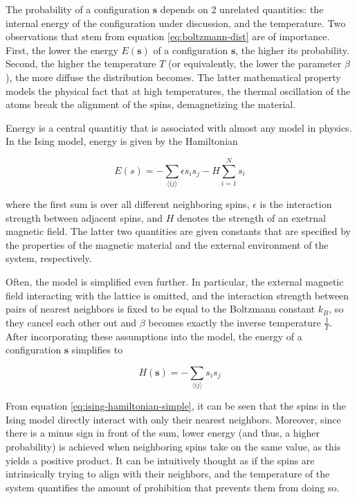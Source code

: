 \documentclass[12pt]{article}
\begin{document}
The probability of a configuration $\boldsymbol{s}$ depends on 2 unrelated quantities: the internal energy of the configuration under discussion, and the temperature. Two observations that stem from equation \ref{eq:boltzmann-dist} are of importance. First, the lower the energy $E(\boldsymbol{s})$ of a configuration $\boldsymbol{s}$, the higher its probability. Second, the higher the temperature $T$ (or equivalently, the lower the parameter $\beta$), the more diffuse the distribution becomes. The latter mathematical property models the physical fact that at high temperatures, the thermal oscillation of the atoms break the alignment of the spins, demagnetizing the material. 

Energy is a central quantitiy that is associated with almost any model in physics. In the Ising model, energy is given by the Hamiltonian

\begin{equation}
E(s) = - \sum_{\langle ij \rangle} \epsilon s_i s_j - H \sum_{i=1}^N s_i
\label{eq:ising-hamiltonian}
\end{equation}

where the first sum is over all different neighboring spins, $\epsilon$ is the interaction strength between adjacent spins, and $H$ denotes the strength of an exetrnal magnetic field. The latter two quantities are given constants that are specified by the properties of the magnetic material and the external environment of the system, respectively.

Often, the model is simplified even further. In particular, the external magnetic field interacting with the lattice is omitted, and the interaction strength between pairs of nearest neighbors is fixed to be equal to the Boltzmann constant $k_B$, so they cancel each other out and $\beta$ becomes exactly the inverse temperature $\frac{1}{T}$. After incorporating these assumptions into the model, the energy of a configuration $\boldsymbol{s}$ simplifies to 

\begin{equation}
H(\boldsymbol{s}) = - \sum_{\langle ij \rangle} s_i s_j
\label{eq:ising-hamiltonian-simple}
\end{equation}

From equation \ref{eq:ising-hamiltonian-simple}, it can be seen that the spins in the Ising model directly interact with only their nearest neighbors. Moreover, since there is a minus sign in front of the sum, lower energy (and thus, a higher probability) is achieved when neighboring spins take on the same value, as this yields a positive product. It can be intuitively thought as if the spins are intrinsically trying to align with their neighbors, and the temperature of the system quantifies the amount of prohibition that prevents them from doing so. 
\end{document}
